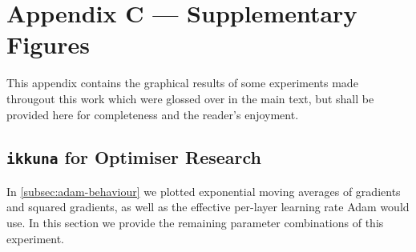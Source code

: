 \chapter{Appendix C --- Supplementary Figures}
\label{ch:appendixC}

This appendix contains the graphical results of some experiments made througout
this work which were glossed over in the main text, but shall be provided here
for completeness and the reader's enjoyment.

\section*{\texttt{ikkuna} for Optimiser Research}%
\label{sec:ikkuna_for_optimiser_research}

In \cref{subsec:adam-behaviour} we plotted exponential moving averages of
gradients and squared gradients, as well as the effective per-layer learning
rate Adam would use. In this section we provide the remaining parameter
combinations of this experiment.

